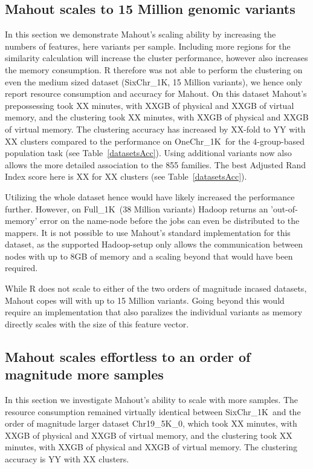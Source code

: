 \documentclass[twocolumn]{bmcart}%
\newcommand{\OneReal}{OneChr\_1K}
\newcommand{\SixReal}{SixChr\_1K}
\newcommand{\FullReal}{Full\_1K}
\newcommand{\SixArtiExact}{Chr19\_5K\_0}
\begin{document}
\subsection*{Mahout scales to 15 Million genomic variants}
In this section we demonstrate Mahout's scaling ability by increasing the numbers of features, here variants per sample. 
Including more regions for the similarity calculation will increase the cluster performance, however also increases the memory consumption. 
R therefore was not able to perform the clustering on even the medium sized dataset (\SixReal , 15 Million variants), we hence only report resource consumption and accuracy for Mahout.
On this dataset Mahout's prepossessing took XX minutes, with XXGB of physical and XXGB of virtual memory, and the clustering took XX minutes, with XXGB of physical and XXGB of virtual memory. 
The clustering accuracy has increased by XX-fold to YY with XX clusters compared to the performance on \OneReal\ for the 4-group-based population task (see Table~\ref{datasetsAcc}).
Using additional variants now also allows the more detailed association to the 855 families.
The best Adjusted Rand Index score here is XX for XX clusters (see Table~\ref{datasetsAcc}).

Utilizing the whole dataset hence would have likely increased the performance further. However, on \FullReal\ (38 Million variants) Hadoop returns an 'out-of-memory' error on the name-node before the jobs can even be distributed to the mappers. 
It is not possible to use Mahout's standard implementation for this dataset, as the supported Hadoop-setup only allows the communication between nodes with up to 8GB of memory and a scaling beyond that would have been required.

While R does not scale to either of the two orders of magnitude incased datasets, Mahout copes will with up to 15 Million variants. Going beyond this would require an implementation that also paralizes the individual variants as memory directly scales with the size of this feature vector.  


\subsection*{Mahout scales effortless to an order of magnitude more samples}
In this section we investigate Mahout's ability to scale with more samples.
The resource consumption remained virtually identical between \SixReal\ and the order of magnitude larger dataset \SixArtiExact, which took XX minutes, with XXGB of physical and XXGB of virtual memory, and the clustering took XX minutes, with XXGB of physical and XXGB of virtual memory. 
The clustering accuracy is YY with XX clusters.
\end{document}
